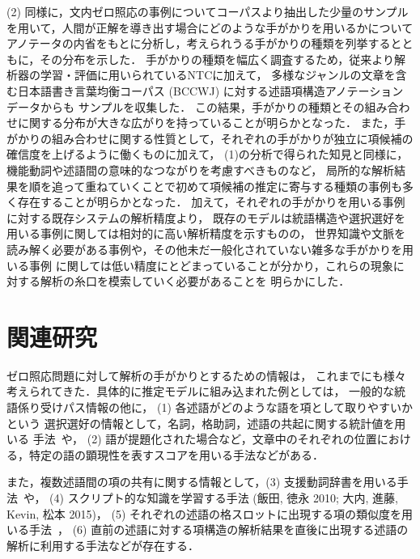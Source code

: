 \documentclass[japanese]{jnlp_1.4}
\begin{document}
(2) 同様に，文内ゼロ照応の事例についてコーパスより抽出した少量のサンプルを用いて，人間が正解を導き出す場合にどのような手がかりを用いるかについて
アノテータの内省をもとに分析し，考えられうる手がかりの種類を列挙するとともに，その分布を示した．
手がかりの種類を幅広く調査するため，従来より解析器の学習・評価に用いられているNTCに加えて，
多様なジャンルの文章を含む日本語書き言葉均衡コーパス (BCCWJ) に対する述語項構造アノテーションデータからも
サンプルを収集した．
この結果，手がかりの種類とその組み合わせに関する分布が大きな広がりを持っていることが明らかとなった．
また，手がかりの組み合わせに関する性質として，それぞれの手がかりが独立に項候補の確信度を上げるように働くものに加えて，
(1)の分析で得られた知見と同様に，機能動詞や述語間の意味的なつながりを考慮すべきものなど，
局所的な解析結果を順を追って重ねていくことで初めて項候補の推定に寄与する種類の事例も多く存在することが明らかとなった．
加えて，それぞれの手がかりを用いる事例に対する既存システムの解析精度より，
既存のモデルは統語構造や選択選好を用いる事例に関しては相対的に高い解析精度を示すものの，
世界知識や文脈を読み解く必要がある事例や，その他未だ一般化されていない雑多な手がかりを用いる事例
に関しては低い精度にとどまっていることが分かり，これらの現象に対する解析の糸口を模索していく必要があることを
明らかにした．


\section{関連研究}

ゼロ照応問題に対して解析の手がかりとするための情報は，
これまでにも様々考えられてきた．具体的に推定モデルに組み込まれた例としては，
一般的な統語係り受けパス情報の他に，
(1) 各述語がどのような語を項として取りやすいかという
選択選好の情報として，名詞，格助詞，述語の共起に関する統計値を用いる
手法~\cite{iida2006exploiting,iida2011cross,imamura2009discriminative,sasano2008fully,sasano2011discriminative}や，
(2) 語が提題化された場合など，文章中のそれぞれの位置における，特定の語の顕現性を表すスコアを用いる手法\cite{sasano2008fully,sasano2011discriminative,imamura2009discriminative,iida2011cross}などがある．

また，複数述語間の項の共有に関する情報として，(3) 支援動詞辞書を用いる手法~\cite{komachi2006noun}や，
    (4) スクリプト的な知識を学習する手法 (飯田, 徳永 2010; 大内, 進藤, Kevin, 松本 2015)\nocite{iida2010jnlp}\nocite{ouchi2015nl}，
(5) それぞれの述語の格スロットに出現する項の類似度を用いる手法~\cite{hayashibe2011japanese}，
(6) 直前の述語に対する項構造の解析結果を直後に出現する述語の解析に利用する手法\cite{imamura2009discriminative,hayashibe2014position}などが存在する．
\end{document}
